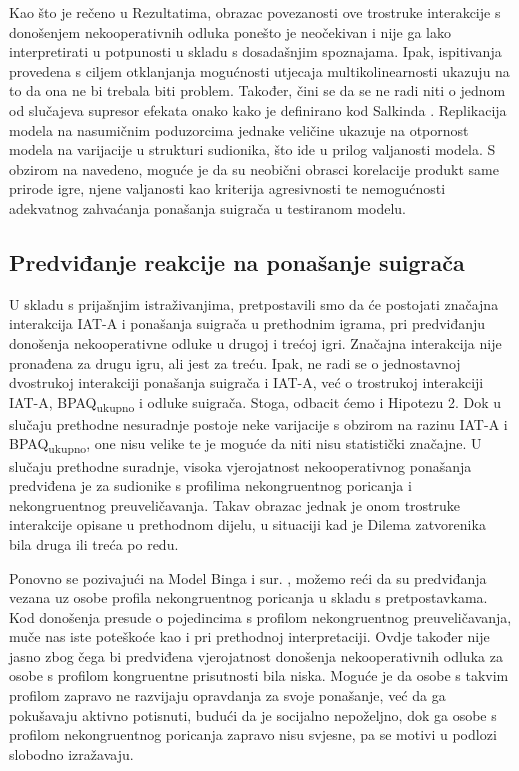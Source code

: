 \documentclass[a4paper, 12pt]{report}
\begin{document}
Kao što je rečeno u Rezultatima, obrazac povezanosti ove trostruke interakcije s
donošenjem nekooperativnih odluka ponešto je neočekivan i nije ga lako
interpretirati u potpunosti u skladu s dosadašnjim spoznajama. 
Ipak, ispitivanja provedena s ciljem otklanjanja mogućnosti utjecaja
multikolinearnosti ukazuju na to da ona ne bi trebala biti problem. 
Također, čini se da se ne radi niti o jednom od slučajeva supresor efekata 
onako kako je definirano kod Salkinda \citeyearpar{salkind2007encyclopedia}.  
Replikacija modela na nasumičnim poduzorcima jednake veličine ukazuje na
otpornost modela na varijacije u strukturi sudionika, što ide u prilog
valjanosti modela. S obzirom na navedeno, moguće je da su neobični obrasci
korelacije produkt same prirode igre, njene valjanosti kao kriterija
agresivnosti te nemogućnosti adekvatnog zahvaćanja ponašanja suigrača u
testiranom modelu.

\subsection{Predviđanje reakcije na ponašanje suigrača} 

U skladu s prijašnjim istraživanjima,
pretpostavili smo da će postojati značajna interakcija IAT-A i ponašanja
suigrača u prethodnim igrama, pri predviđanju donošenja nekooperativne odluke u
drugoj i trećoj igri. Značajna interakcija nije pronađena za drugu igru, ali
jest za treću. Ipak, ne radi se o jednostavnoj dvostrukoj interakciji ponašanja
suigrača i IAT-A, već o trostrukoj interakciji IAT-A, BPAQ\textsubscript{ukupno}
i odluke suigrača. Stoga, odbacit ćemo i Hipotezu 2.
Dok u slučaju prethodne nesuradnje postoje neke varijacije s
obzirom na razinu IAT-A i BPAQ\textsubscript{ukupno}, one nisu velike
te je moguće da niti nisu statistički značajne. U slučaju prethodne suradnje, 
visoka vjerojatnost nekooperativnog ponašanja predviđena je za sudionike s
profilima nekongruentnog poricanja i nekongruentnog preuveličavanja. Takav
obrazac jednak je onom trostruke interakcije opisane u prethodnom dijelu, u
situaciji kad je Dilema zatvorenika bila druga ili treća po redu.

Ponovno se pozivajući na Model Binga i sur. \citeyearpar{bing2007integrating},
možemo reći da su predviđanja vezana uz osobe profila nekongruentnog
poricanja u skladu s pretpostavkama. Kod donošenja presude o pojedincima s
profilom nekongruentnog preuveličavanja, muče nas iste poteškoće kao i pri
prethodnoj interpretaciji. Ovdje također nije jasno zbog čega bi predviđena
vjerojatnost donošenja nekooperativnih odluka za osobe s profilom kongruentne
prisutnosti bila niska.
Moguće je da osobe s takvim profilom zapravo
ne razvijaju opravdanja za svoje ponašanje, već da ga pokušavaju aktivno
potisnuti, budući da je socijalno nepoželjno, dok ga osobe s profilom
nekongruentnog poricanja zapravo nisu svjesne, pa se motivi u podlozi slobodno
izražavaju. 
\end{document}

